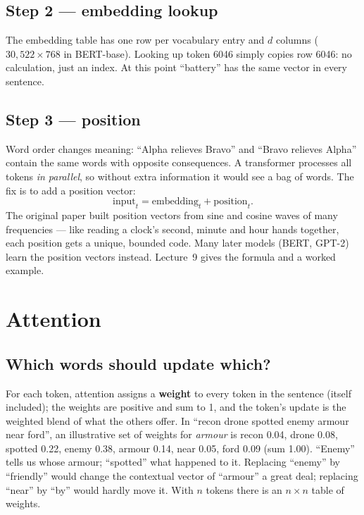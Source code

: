 \documentclass[11pt]{article}
\begin{document}
\subsection{Step 2 --- embedding lookup}
The embedding table has one row per vocabulary entry and $d$ columns ($30{,}522\times768$ in BERT-base). Looking up token 6046 simply copies row 6046: no calculation, just an index. At this point ``battery'' has the same vector in every sentence.

\subsection{Step 3 --- position}
Word order changes meaning: ``Alpha relieves Bravo'' and ``Bravo relieves Alpha'' contain the same words with opposite consequences. A transformer processes all tokens \emph{in parallel}, so without extra information it would see a bag of words. The fix is to add a position vector:
\[\text{input}_t=\text{embedding}_t+\text{position}_t.\]
The original paper built position vectors from sine and cosine waves of many frequencies --- like reading a clock's second, minute and hour hands together, each position gets a unique, bounded code. Many later models (BERT, GPT-2) learn the position vectors instead. Lecture~9 gives the formula and a worked example.

\section{Attention}\label{sec:att}
\subsection{Which words should update which?}
For each token, attention assigns a \textbf{weight} to every token in the sentence (itself included); the weights are positive and sum to 1, and the token's update is the weighted blend of what the others offer. In ``recon drone spotted enemy armour near ford'', an illustrative set of weights for \emph{armour} is recon 0.04, drone 0.08, spotted 0.22, enemy 0.38, armour 0.14, near 0.05, ford 0.09 (sum 1.00). ``Enemy'' tells us whose armour; ``spotted'' what happened to it. Replacing ``enemy'' by ``friendly'' would change the contextual vector of ``armour'' a great deal; replacing ``near'' by ``by'' would hardly move it. With $n$ tokens there is an $n\times n$ table of weights.
\end{document}
